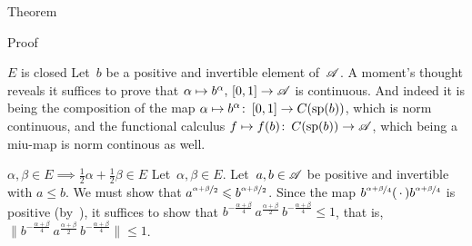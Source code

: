 \documentclass[a]{subfiles}
\begin{document}
\begin{parsec}
\begin{point}{Theorem}
\begin{point}{Proof}
\begin{point}{$E$ is closed}
Let~$b$ be a positive and invertible element of~$\scrA$.
A moment's thought reveals it suffices to 
prove that $\alpha\mapsto b^\alpha, \,[0,1]\to\scrA$
is continuous.
And indeed it is
being
the composition of the map $\alpha \mapsto b^\alpha\colon\,[0,1]
\to C(\spec(b))$, 
	which is norm continuous,
and the functional
	calculus $f\mapsto f(b)\colon\,
	C(\spec(b))\to \scrA$, which being a miu-map is norm continous
	as well.
\end{point}
\begin{point}{$\alpha,\beta\in E\implies \frac{1}{2}\alpha+\frac{1}{2}\beta
	\in E$}
Let~$\alpha,\beta\in E$. Let~$a,b\in\scrA$ be positive
and invertible with $a\leq b$.
We must show that $a^{\nicefrac{\alpha+\beta}{2}}\leq 
b^{\nicefrac{\alpha+\beta}{2}}$.
Since the map $b^{\nicefrac{\alpha+\beta}{4}}(\,\cdot\,)
b^{\nicefrac{\alpha+\beta}{4}}$
is positive (by~),
it suffices to show that
$b^{-\frac{\alpha+\beta}{4}}\,a^{\frac{\alpha+\beta}{2}}\,
b^{-\frac{\alpha+\beta}{4}} \leq 1$,
that is, 
$\|b^{-\frac{\alpha+\beta}{4}}\,a^{\frac{\alpha+\beta}{2}}\,
b^{-\frac{\alpha+\beta}{4}} \| \leq 1$.


\end{point}
\end{point}
\end{point}
\end{parsec}
\end{document}
